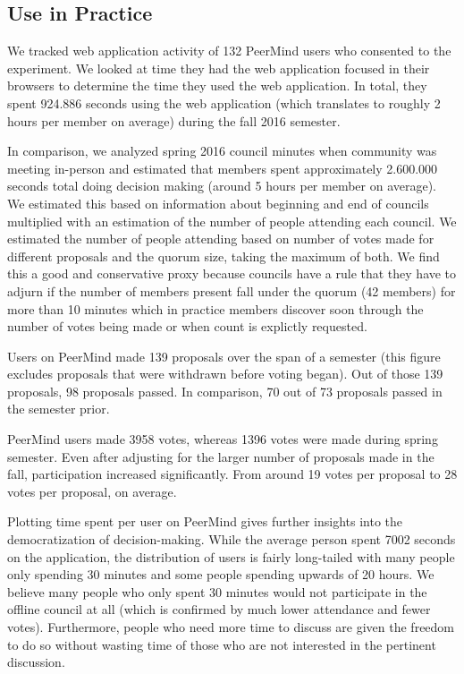 \documentclass[format=acmsmall, review=true, screen=true, anonymous=true]{acmart}
\begin{document}
\subsection{Use in Practice}

We tracked web application activity of 132 PeerMind users who consented to the experiment.
We looked at time they had the web application focused in their browsers to determine the
time they used the web application.
In total, they spent 924.886 seconds using the web application (which translates to roughly 2 hours
per member on average) during the fall 2016 semester.

In comparison, we analyzed spring 2016 council minutes when community was meeting in-person and
estimated that members spent approximately 2.600.000 seconds total doing decision making
(around 5 hours per member on average).
We estimated this based on information about beginning and end of councils multiplied
with an estimation of the number of people attending each council.
We estimated the number of people attending based on number of votes made for different proposals
and the quorum size, taking the maximum of both.
We find this a good and conservative proxy because councils have a rule that they have to adjurn
if the number of members present fall under the quorum (42 members) for more than 10 minutes
which in practice members discover soon through the number of votes being made or when count
is explictly requested.

Users on PeerMind made 139 proposals over the span of a semester (this figure
excludes proposals that were withdrawn before voting began).
Out of those 139 proposals, 98 proposals passed. In comparison, 70 out of 73 proposals passed
in the semester prior.

PeerMind users made 3958 votes, whereas 1396 votes were made during spring semester.
Even after adjusting for the larger number of proposals made in the fall, participation
increased significantly.
From around 19 votes per proposal to 28 votes per proposal, on average.



Plotting time spent per user on PeerMind gives further insights into the democratization of decision-making. While the average person spent 7002 seconds on the application, the distribution of users is fairly long-tailed with many people only spending 30 minutes and some people spending upwards of 20 hours. We believe many people who only spent 30 minutes would not participate in the offline council at all (which is confirmed by much lower attendance and fewer votes). Furthermore, people who need more time to discuss are given the freedom to do so without wasting time of those who are not interested in the pertinent discussion.
\end{document}
